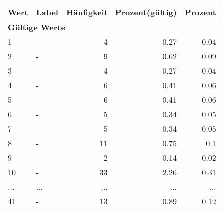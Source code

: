      \begin{longtable}{lXrrr}
     \toprule
     \textbf{Wert} & \textbf{Label} & \textbf{Häufigkeit} & \textbf{Prozent(gültig)} & \textbf{Prozent} \\
     \endhead
     \midrule
     \multicolumn{5}{l}{\textbf{Gültige Werte}}\\
        1 & \multicolumn{1}{X}{-} & %
          \num{4} &
          \num[round-mode=places,round-precision=2]{0,27} &
          \num[round-mode=places,round-precision=2]{0,04} \\
        2 & \multicolumn{1}{X}{-} & %
          \num{9} &
          \num[round-mode=places,round-precision=2]{0,62} &
          \num[round-mode=places,round-precision=2]{0,09} \\
        3 & \multicolumn{1}{X}{-} & %
          \num{4} &
          \num[round-mode=places,round-precision=2]{0,27} &
          \num[round-mode=places,round-precision=2]{0,04} \\
        4 & \multicolumn{1}{X}{-} & %
          \num{6} &
          \num[round-mode=places,round-precision=2]{0,41} &
          \num[round-mode=places,round-precision=2]{0,06} \\
        5 & \multicolumn{1}{X}{-} & %
          \num{6} &
          \num[round-mode=places,round-precision=2]{0,41} &
          \num[round-mode=places,round-precision=2]{0,06} \\
        6 & \multicolumn{1}{X}{-} & %
          \num{5} &
          \num[round-mode=places,round-precision=2]{0,34} &
          \num[round-mode=places,round-precision=2]{0,05} \\
        7 & \multicolumn{1}{X}{-} & %
          \num{5} &
          \num[round-mode=places,round-precision=2]{0,34} &
          \num[round-mode=places,round-precision=2]{0,05} \\
        8 & \multicolumn{1}{X}{-} & %
          \num{11} &
          \num[round-mode=places,round-precision=2]{0,75} &
          \num[round-mode=places,round-precision=2]{0,1} \\
        9 & \multicolumn{1}{X}{-} & %
          \num{2} &
          \num[round-mode=places,round-precision=2]{0,14} &
          \num[round-mode=places,round-precision=2]{0,02} \\
        10 & \multicolumn{1}{X}{-} & %
          \num{33} &
          \num[round-mode=places,round-precision=2]{2,26} &
          \num[round-mode=places,round-precision=2]{0,31} \\
       ... & ... & ... & ... & ... \\
        41 & \multicolumn{1}{X}{-} & %
          \num{13} &
          \num[round-mode=places,round-precision=2]{0,89} &
          \num[round-mode=places,round-precision=2]{0,12} \\


\end{longtable}
